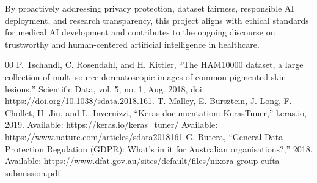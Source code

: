 \documentclass[conference]{IEEEtran}
\begin{document}
	By proactively addressing privacy protection, dataset fairness, responsible AI deployment, and research transparency, this project aligns with ethical standards for medical AI development and contributes to the ongoing discourse on trustworthy and human-centered artificial intelligence in healthcare.
	
	\begin{thebibliography}{00}
		 P. Tschandl, C. Rosendahl, and H. Kittler, “The HAM10000 dataset, a large collection of multi-source dermatoscopic images of common pigmented skin lesions,” Scientific Data, vol. 5, no. 1, Aug. 2018, doi: https://doi.org/10.1038/sdata.2018.161. T. Malley, E. Bursztein, J. Long, F. Chollet, H. Jin, and L. Invernizzi, “Keras documentation: KerasTuner,” keras.io, 2019. Available: https://keras.io/keras\_tuner/
		 Available: https://www.nature.com/articles/sdata2018161
         G. Butera, “General Data Protection Regulation (GDPR): What’s in it for Australian organisations?,” 2018. Available: https://www.dfat.gov.au/sites/default/files/nixora-group-eufta-submission.pdf

‌
	\end{thebibliography}
\end{document}
